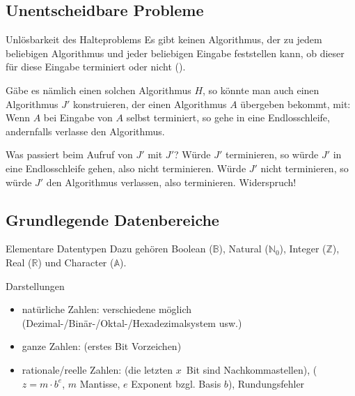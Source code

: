 \subsection{%
    Unentscheidbare Probleme%
}

\begin{Satz}{Unlösbarkeit des Halteproblems}
    Es gibt keinen Algorithmus, der zu jedem beliebigen Algorithmus und jeder
    beliebigen Eingabe feststellen kann, ob dieser für diese Eingabe terminiert
    oder nicht ().
    
    Gäbe es nämlich einen solchen Algorithmus $H$, so könnte man auch einen
    Algorithmus $J'$ konstruieren, der einen Algorithmus $A$ übergeben bekommt,
    mit:
    Wenn $A$ bei Eingabe von $A$ selbst terminiert, so gehe in eine
    Endlosschleife, andernfalls verlasse den Algorithmus.
    
    Was passiert beim Aufruf von $J'$ mit $J'$? Würde $J'$ terminieren, so
    würde $J'$ in eine Endlosschleife gehen, also nicht terminieren.
    Würde $J'$  nicht terminieren, so würde $J'$ den Algorithmus verlassen,
    also terminieren.
    Widerspruch!
\end{Satz}

\subsection{%
    Grundlegende Datenbereiche%
}

\begin{Def}{Elementare Datentypen}
    Dazu gehören Boolean ($\mathbb{B}$), Natural ($\mathbb{N}_0$),
    Integer ($\mathbb{Z}$), Real ($\mathbb{R}$) und Character ($\mathbb{A}$).
\end{Def}

\begin{Def}{Darstellungen}
    \begin{itemize}
        \item natürliche Zahlen: verschiedene 
        möglich \\
        (Dezimal-/Binär-/Oktal-/Hexadezimalsystem usw.)
        
        \item ganze Zahlen: 
        (erstes Bit Vorzeichen)
        
        \item rationale/reelle Zahlen: 
        (die letzten $x$~Bit sind Nachkommastellen),
        ($z = m \cdot b^e$, $m$ Mantisse, $e$ Exponent bzgl. Basis $b$),
        Rundungsfehler
    \end{itemize}
\end{Def}

